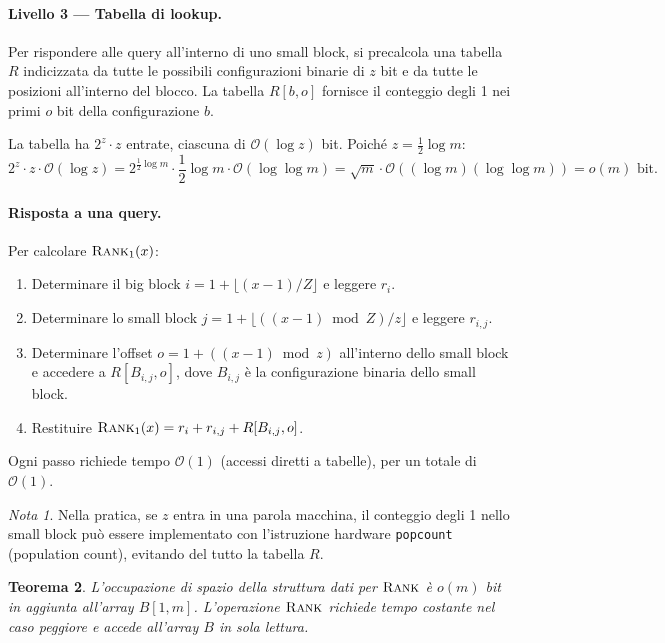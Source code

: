 \documentclass[12pt, a4paper, oneside]{book}
\theoremstyle{plain}
\newtheorem{teorema}{Teorema}[chapter]
\theoremstyle{definition}
\theoremstyle{remark}
\newtheorem{nota}[teorema]{Nota}
\newcommand{\OO}[1]{\mathcal{O}\!\left(#1\right)}
\begin{document}
\paragraph{Livello 3 — Tabella di lookup.} Per rispondere alle query all'interno di uno small block, si precalcola una tabella $R$ indicizzata da tutte le possibili configurazioni binarie di $z$ bit e da tutte le posizioni all'interno del blocco. La tabella $R[b, o]$ fornisce il conteggio degli 1 nei primi $o$ bit della configurazione $b$.

La tabella ha $2^z \cdot z$ entrate, ciascuna di $\OO{\log z}$ bit. Poiché $z = \frac{1}{2}\log m$:
\[
  2^z \cdot z \cdot \OO{\log z} = 2^{\frac{1}{2}\log m} \cdot \frac{1}{2}\log m \cdot \OO{\log \log m} = \sqrt{m} \cdot \OO{(\log m)(\log \log m)} = o(m) \text{ bit.}
\]

\paragraph{Risposta a una query.} Per calcolare $\textsc{Rank}_1(x)$:
\begin{enumerate}
  \item Determinare il big block $i = 1 + \lfloor (x-1)/Z \rfloor$ e leggere $r_i$.
  \item Determinare lo small block $j = 1 + \lfloor ((x-1) \bmod Z) / z \rfloor$ e leggere $r_{i,j}$.
  \item Determinare l'offset $o = 1 + ((x-1) \bmod z)$ all'interno dello small block e accedere a $R[B_{i,j}, o]$, dove $B_{i,j}$ è la configurazione binaria dello small block.
  \item Restituire $\textsc{Rank}_1(x) = r_i + r_{i,j} + R[B_{i,j}, o]$.
\end{enumerate}

Ogni passo richiede tempo $\OO{1}$ (accessi diretti a tabelle), per un totale di $\OO{1}$.

\begin{nota}
Nella pratica, se $z$ entra in una parola macchina, il conteggio degli 1 nello small block può essere implementato con l'istruzione hardware \texttt{popcount} (population count), evitando del tutto la tabella $R$.
\end{nota}

\begin{teorema}
\label{thm:rank-succinct}
L'occupazione di spazio della struttura dati per $\textsc{Rank}$ è $o(m)$ bit in aggiunta all'array $B[1,m]$. L'operazione $\textsc{Rank}$ richiede tempo costante nel caso peggiore e accede all'array $B$ in sola lettura.
\end{teorema}
\end{document}
